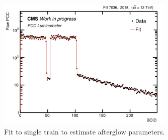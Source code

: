 

\begin{figure}[H]
  \centering
    \includegraphics[width=0.75\textwidth]{ashish_thesis/2018_af_fit_1.png} 
  \caption[Afterglow effect fit]{Fit to single train to estimate afterglow parameters.}
  \label{fig:af_fit99}
\end{figure}



